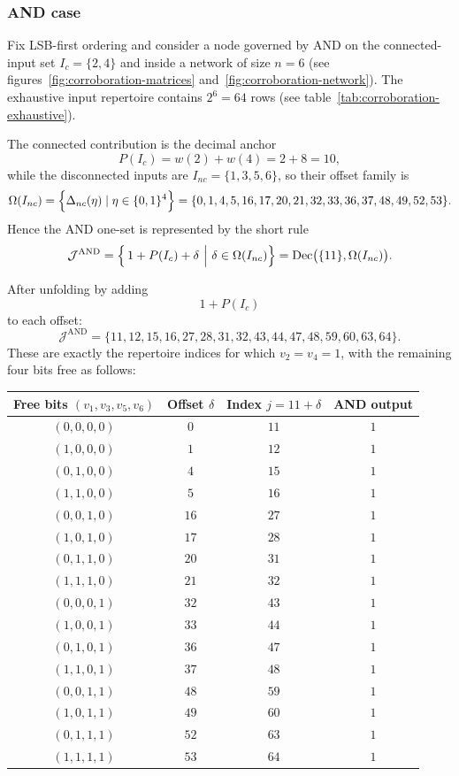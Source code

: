 \documentclass[11pt]{article}
\theoremstyle{definition}
\newcommand{\Ic}{I_c}
\newcommand{\J}{\mathcal{J}}
\newcommand{\bits}{\{0,1\}}
\begin{document}
\subsubsection{AND case}
Fix LSB-first ordering and consider a node governed by AND on the connected-input set \(\Ic=\{2,4\}\) 
 and inside a network of size \(n=6\) (see figures~\ref{fig:corroboration-matrices} and~\ref{fig:corroboration-network}). 
The exhaustive input repertoire contains \(2^6=64\) rows (see table~\ref{tab:corroboration-exhaustive}).

The connected contribution is the decimal anchor
\[
P(\Ic)=w(2)+w(4)=2+8=10,
\]
while the disconnected inputs are \(I_{nc}=\{1,3,5,6\}\), so their offset family is
\[
\Omega(I_{nc})=\Bigl\{\Delta_{nc}(\eta)\mid \eta\in\bits^{4}\Bigr\}
=
\{0,1,4,5,16,17,20,21,32,33,36,37,48,49,52,53\}.
\]
Hence the AND one-set is represented by the short rule
\[
\J^{\mathrm{AND}}
=
\Bigl\{\,1+P(\Ic)+\delta \ \Big| \ \delta\in\Omega(I_{nc})\Bigr\}
=
\operatorname{Dec}\bigl(\{11\},\Omega(I_{nc})\bigr).
\]

After unfolding by adding \[1+P(\Ic)\] to each offset:
\[
\J^{\mathrm{AND}}=\{11,12,15,16,27,28,31,32,43,44,47,48,59,60,63,64\}.
\]
These are exactly the repertoire indices for which \(v_2=v_4=1\), with the remaining four bits free as follows:

\begin{center}
\small
\begin{tabular}{cccc}
\toprule
Free bits \((v_1,v_3,v_5,v_6)\) & Offset \(\delta\) & Index \(j=11+\delta\) & AND output \\
\midrule
\((0,0,0,0)\) & \(0\)  & \(11\) & \(1\) \\
\((1,0,0,0)\) & \(1\)  & \(12\) & \(1\) \\
\((0,1,0,0)\) & \(4\)  & \(15\) & \(1\) \\
\((1,1,0,0)\) & \(5\)  & \(16\) & \(1\) \\
\((0,0,1,0)\) & \(16\) & \(27\) & \(1\) \\
\((1,0,1,0)\) & \(17\) & \(28\) & \(1\) \\
\((0,1,1,0)\) & \(20\) & \(31\) & \(1\) \\
\((1,1,1,0)\) & \(21\) & \(32\) & \(1\) \\
\((0,0,0,1)\) & \(32\) & \(43\) & \(1\) \\
\((1,0,0,1)\) & \(33\) & \(44\) & \(1\) \\
\((0,1,0,1)\) & \(36\) & \(47\) & \(1\) \\
\((1,1,0,1)\) & \(37\) & \(48\) & \(1\) \\
\((0,0,1,1)\) & \(48\) & \(59\) & \(1\) \\
\((1,0,1,1)\) & \(49\) & \(60\) & \(1\) \\
\((0,1,1,1)\) & \(52\) & \(63\) & \(1\) \\
\((1,1,1,1)\) & \(53\) & \(64\) & \(1\) \\
\bottomrule
\end{tabular}
\end{center}
\end{document}
